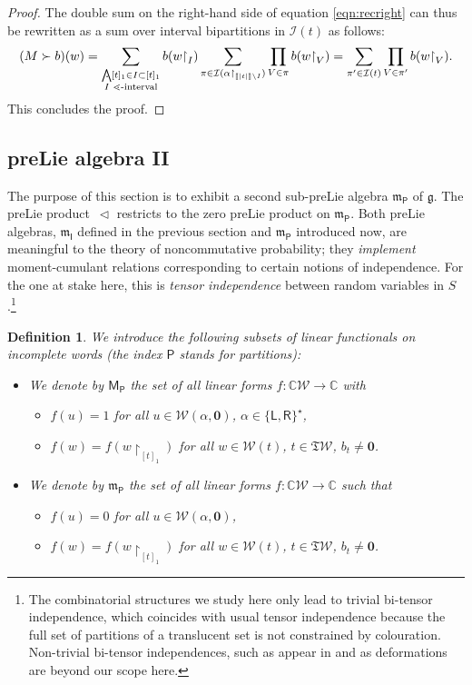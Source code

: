 \documentclass[pdftex]{sigma}
\renewcommand{\restriction}[2]{{#1\mathbin{\upharpoonright}_{#2}}}
\newcommand{\linearspan}[1]{{\CC #1}}
\newcommand{\stdl}{\lessdot}
\newcommand{\bigwedgedots}{{\mathop{\bigwedge\hspace{-6.5pt}\raisebox{-1.5pt}[0pt][0pt]{$\cdot$}\hspace{2pt}}\nolimits}}
\newcommand{\SWc}{{\mathfrak{T}\mathcal{W}}}
\newcommand\IWc{\mathcal{W}}
\def\BBc{{\mathcal{I}}}
\newcommand\LL{{\mathsf{L}}}
\newcommand\RR{{\mathsf{R}}}
\def\CC{\mathbb{C}}
\newcommand\shalI{{\mathfrak m}_{\mathsf I}}
\newcommand{\shalII}{{\mathfrak m}_{\mathsf P}}
\newcommand{\shgrII}{{\mathsf M}_{\mathsf P}}
\numberwithin{equation}{section}
\newtheorem{Definition}[Theorem]{Definition}
\begin{document}
\begin{proof}
	The double sum on the right-hand side of equation \eqref{eqn:recright} can thus be rewritten as a sum over interval bipartitions in $\BBc(t)$ as follows:
	\begin{equation*}
		(M\succ b)(w) = \sum_{\substack{\bigwedgedots [t]_1\in I\subset [t]_1 \\
		\text{$I$ $\stdl$-interval}}} b(\restriction{w}{I})\sum_{\pi \in \BBc(\restriction{\alpha}{\llbracket |t| \rrbracket\setminus I})} \prod_{V\in\pi}b(\restriction{w}{V}) = \sum_{\pi^{\prime}\in \BBc(t)} \prod_{V\in\pi^{\prime}}b(\restriction{w}{V}).
	\end{equation*}
	This concludes the proof.
\end{proof}

\subsection{preLie algebra II}
The purpose of this section is to exhibit a second sub-preLie algebra $\shalII$ of $\mathfrak{g}$. The preLie product~$\vartriangleleft$ restricts to the zero preLie product on $\shalII$.
Both preLie algebras, $\shalI$ defined in the previous section and $\shalII$ introduced now, are meaningful to the theory of noncommutative probability; they \emph{implement} moment-cumulant relations corresponding to certain notions of independence. For the one at stake here, this is \emph{tensor independence} between random variables in $S$.\footnote{The combinatorial structures we study here only lead to trivial bi-tensor independence, which coincides with usual tensor independence because the full set of partitions of a translucent set is not constrained by colouration. Non-trivial bi-tensor independences, such as appear in \cite{GHU21p} and \cite{Varso-PhD} as deformations are beyond our scope here.}

\begin{Definition}\label{def:M}We introduce the following subsets of linear functionals on incomplete words (the index $\mathsf P$ stands for partitions):
	\begin{itemize}\itemsep=0pt
		\item We denote by $\shgrII$ the set of all linear forms $f\colon \linearspan{\IWc}\rightarrow \CC$ with
		 \begin{itemize}\itemsep=0pt
			 \item $f(u) = 1$ for all $u \in \IWc(\alpha,\mathbf{0})$, $\alpha \in \{\LL,\RR\}^{\star}$,
\item $f(w)=f(\restriction{w}{[t]_1})$ for all $w\in\IWc(t)$, $t\in\SWc$, $b_t\neq \mathbf{0}$.
		 \end{itemize}
		\item We denote by $\shalII$ the set of all linear forms $f\colon \linearspan{\IWc}\to \CC$ such that
		 \begin{itemize}\itemsep=0pt
			 \item $f(u) = 0$ for all $u \in \IWc(\alpha,\mathbf{0})$,
			 \item $f(w)=f(\restriction{w}{[t]_1})$ for all $w\in\IWc(t)$, $t\in\SWc$, $b_t\neq \mathbf{0}$.
		 \end{itemize}
	\end{itemize}
\end{Definition}
\end{document}

